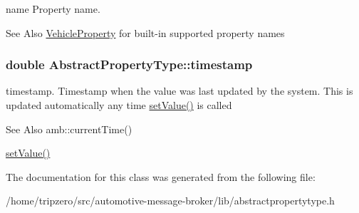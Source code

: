 name Property name. 

\begin{DoxySeeAlso}{See Also}
\hyperlink{classVehicleProperty}{Vehicle\-Property} for built-\/in supported property names 
\end{DoxySeeAlso}
\hypertarget{classAbstractPropertyType_a6a391546600fde38a351d3d236be8a9b}{
\subsubsection[{timestamp}]{\setlength{\rightskip}{0pt plus 5cm}double Abstract\-Property\-Type\-::timestamp}}\label{classAbstractPropertyType_a6a391546600fde38a351d3d236be8a9b}


timestamp. Timestamp when the value was last updated by the system. This is updated automatically any time \hyperlink{classAbstractPropertyType_a1b2598b86718911533587a5bd41bfb9c}{set\-Value()} is called 

\begin{DoxySeeAlso}{See Also}
amb\-::current\-Time() 

\hyperlink{classAbstractPropertyType_a1b2598b86718911533587a5bd41bfb9c}{set\-Value()} 
\end{DoxySeeAlso}


The documentation for this class was generated from the following file\-:\begin{DoxyCompactItemize}
\item 
/home/tripzero/src/automotive-\/message-\/broker/lib/abstractpropertytype.\-h\end{DoxyCompactItemize}
